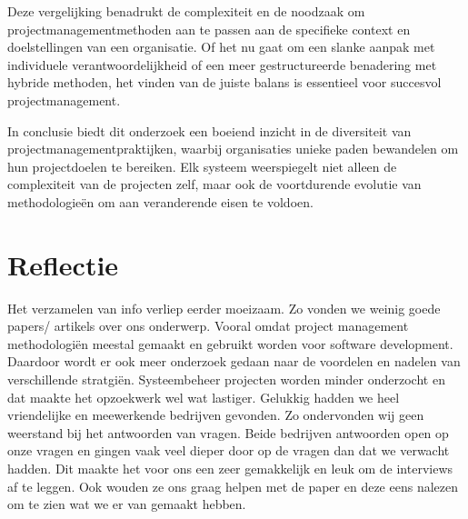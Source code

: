 \documentclass[dutch]{hogent-article}
\begin{document}
Deze vergelijking benadrukt de complexiteit en de noodzaak om projectmanagementmethoden aan te passen aan de specifieke context en doelstellingen van een organisatie. Of het nu gaat om een slanke aanpak met individuele verantwoordelijkheid of een meer gestructureerde benadering met hybride methoden, het vinden van de juiste balans is essentieel voor succesvol projectmanagement.
\newline

In conclusie biedt dit onderzoek een boeiend inzicht in de diversiteit van projectmanagementpraktijken, waarbij organisaties unieke paden bewandelen om hun projectdoelen te bereiken. Elk systeem weerspiegelt niet alleen de complexiteit van de projecten zelf, maar ook de voortdurende evolutie van methodologieën om aan veranderende eisen te voldoen.
\newline

\section{Reflectie}
\label{sec:reflectie}

Het verzamelen van info verliep eerder moeizaam. Zo vonden we weinig goede papers/ artikels over ons onderwerp. Vooral omdat project management methodologi\"en meestal gemaakt en gebruikt worden voor software development. Daardoor wordt er ook meer onderzoek gedaan naar de voordelen en nadelen van verschillende stratgi\"en. Systeembeheer projecten worden minder onderzocht en dat maakte het opzoekwerk wel wat lastiger. Gelukkig hadden we heel vriendelijke en meewerkende bedrijven gevonden. Zo ondervonden wij geen weerstand bij het antwoorden van vragen. Beide bedrijven antwoorden open op onze vragen en gingen vaak veel dieper door op de vragen dan dat we verwacht hadden. Dit maakte het voor ons een zeer gemakkelijk en leuk om de interviews af te leggen. Ook wouden ze ons graag helpen met de paper en deze eens nalezen om te zien wat we er van gemaakt hebben. 

\printbibliography[heading=bibintoc]
\end{document}

